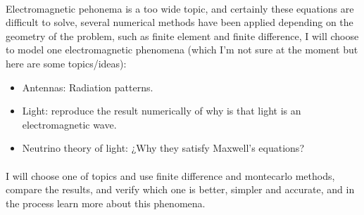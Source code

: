 \documentclass{article}
\begin{document}
\paragraph{} Electromagnetic pehonema is a too wide topic, and certainly these equations are difficult to solve, several numerical methods have been applied depending on the geometry of the problem, such as finite element and finite difference, I will choose to model one electromagnetic phenomena (which I'm not sure at the moment but here are some topics/ideas):
\begin{itemize}
	\item Antennas: Radiation patterns.
	\item Light: reproduce the result numerically of why is that light is an electromagnetic wave.
	\item Neutrino theory of light: ¿Why they satisfy Maxwell's equations?
\end{itemize}
\paragraph{} I will choose one of topics and use finite difference and montecarlo methods, compare the results, and verify which one is better, simpler and accurate, and in the process learn more about this phenomena.

\nocite{*}



\end{document}
